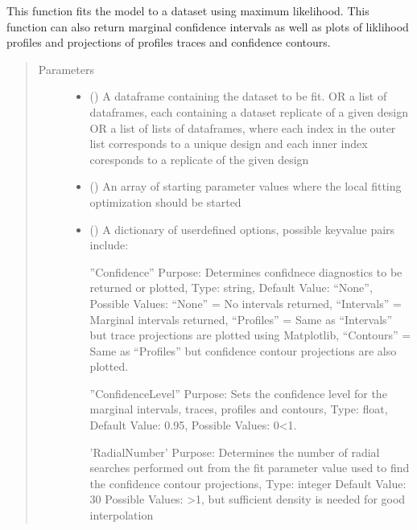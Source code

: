 \documentclass[letterpaper,10pt,english,openany,oneside]{sphinxmanual}
\begin{document}
\begin{fulllineitems}
\begin{fulllineitems}
This function fits the model to a dataset using maximum likelihood. This function can also
return marginal confidence intervals as well as plots of liklihood profiles and projections
of profiles traces and confidence contours.
\begin{quote}\begin{description}
\item[{Parameters}] \leavevmode\begin{itemize}
\item {} 
 () \textendash{} A dataframe containing the dataset to be fit.
OR a list of dataframes, each containing a dataset replicate of a given design
OR a list of lists of dataframes, where each index in the outer list corresponds
to a unique design and each inner index coresponds to a replicate of the given design

\item {} 
 (\sphinxstyleliteralemphasis{\sphinxupquote{, }}) \textendash{} An array of starting parameter values where the
local fitting optimization should be started

\item {} 
 (\sphinxstyleliteralemphasis{\sphinxupquote{, }}) \textendash{} 
A dictionary of user\sphinxhyphen{}defined options, possible key\sphinxhyphen{}value pairs
include:

”Confidence” \textendash{}
Purpose: Determines confidnece diagnostics to be returned or plotted,
Type: string,
Default Value: “None”,
Possible Values:
“None” = No intervals returned,
“Intervals” = Marginal intervals returned,
“Profiles” = Same as “Intervals” but trace projections are plotted using Matplotlib,
“Contours” = Same as  “Profiles” but confidence contour projections are also plotted.

”ConfidenceLevel” \textendash{}
Purpose: Sets the confidence level for the marginal intervals, traces, profiles and contours,
Type: float,
Default Value: 0.95,
Possible Values: 0\textless{}1.

’RadialNumber’ \textendash{}
Purpose: Determines the number of radial searches performed out from the fit
parameter value used to find the confidence contour projections,
Type: integer
Default Value: 30
Possible Values: \textgreater{}1, but sufficient density is needed for good interpolation


\end{itemize}
\end{description}
\end{quote}
\end{fulllineitems}
\end{fulllineitems}
\end{document}
